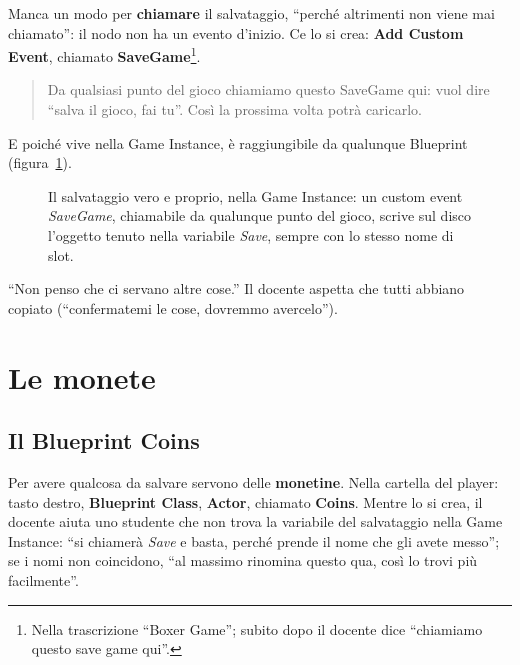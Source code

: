 Manca un modo per \textbf{chiamare} il salvataggio, ``perché altrimenti non viene
mai chiamato'': il nodo non ha un evento d'inizio. Ce lo si crea: \textbf{Add
Custom Event}, chiamato \textbf{SaveGame}\footnote{Nella trascrizione ``Boxer
Game''; subito dopo il docente dice ``chiamiamo questo save game qui''.}.
\begin{quote}
Da qualsiasi punto del gioco chiamiamo questo SaveGame qui: vuol dire ``salva il
gioco, fai tu''. Così la prossima volta potrà caricarlo.
\end{quote}
E poiché vive nella Game Instance, è raggiungibile da qualunque Blueprint
(figura~\ref{gd16:fig:save}).

\begin{figure}[htbp]
\centering
{}
\caption{Il salvataggio vero e proprio, nella Game Instance: un custom event
\emph{SaveGame}, chiamabile da qualunque punto del gioco, scrive sul disco
l'oggetto tenuto nella variabile \emph{Save}, sempre con lo stesso nome di
slot.}
\label{gd16:fig:save}
\end{figure}

``Non penso che ci servano altre cose.'' Il docente aspetta che tutti abbiano
copiato (``confermatemi le cose, dovremmo avercelo'').


\section{Le monete}
\label{gd16:sec:monete}

\subsection{Il Blueprint Coins}

Per avere qualcosa da salvare servono delle \textbf{monetine}. Nella cartella
del player: tasto destro, \textbf{Blueprint Class}, \textbf{Actor}, chiamato
\textbf{Coins}. Mentre lo si crea, il docente aiuta uno studente che non trova
la variabile del salvataggio nella Game Instance: ``si chiamerà \emph{Save} e
basta, perché prende il nome che gli avete messo''; se i nomi non coincidono,
``al massimo rinomina questo qua, così lo trovi più facilmente''.

